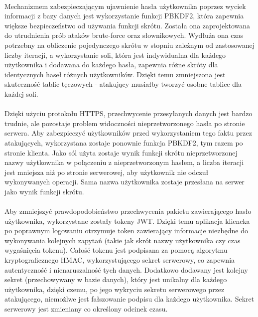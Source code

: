 \documentclass{article}
\begin{document}
    \paragraph{}Mechanizmem zabezpieczającym ujawnienie hasła użytkownika poprzez wyciek informacji z bazy danych jest wykorzystanie funkcji  PBKDF2, która zapewnia większe bezpieczeństwo od używania funkcji skrótu. Została ona zaprojektowana do utrudnienia prób ataków brute-force oraz słownikowych. Wydłuża ona czas potrzebny na obliczenie pojedynczego skrótu w stopniu zależnym od zastosowanej liczby iteracji, a wykorzystanie soli, która jest indywidualna dla każdego użytkownika i dodawana do każdego hasła, zapewnia różne skróty dla identycznych haseł różnych użytkowników. Dzięki temu zmniejszona jest skuteczność tablic tęczowych - atakujący musiałby tworzyć osobne tablice dla każdej soli.

    \paragraph{}Dzięki użyciu protokołu HTTPS, przechwycenie przesyłanych danych jest bardzo trudnie, ale pozostaje problem widoczności nieprzetworzonego hasła po stronie serwera. Aby zabezpieczyć użytkowników przed wykorzystaniem tego faktu przez atakujących, wykorzystana zostaje ponownie funkcja PBKDF2, tym razem po stronie klienta. Jako sól użyta zostaje wynik funkcji skrótu nieprzetworzonej nazwy użytkownika w połączeniu z nieprzetworzonym hasłem, a liczba iteracji jest mniejsza niż po stronie serwerowej, aby użytkownik nie odczuł wykonywanych operacji. Sama nazwa użytkownika zostaje przesłana na serwer jako wynik funkcji skrótu.

    \paragraph{}Aby zmniejszyć prawdopodobieństwo przechwycenia pakietu zawierającego hasło użytkownika, wykorzystane zostały tokeny JWT. Dzięki temu aplikacja kliencka po poprawnym logowaniu otrzymuje token zawierający informacje niezbędne do wykonywania kolejnych zapytań (takie jak skrót nazwy użytkownika czy czas wygaśnięcia tokenu). Całość tokenu jest podpisana za pomocą algorytmu kryptograficznego HMAC, wykorzystującego sekret serwerowy, co zapewnia autentyczność i nienaruszalność tych danych. Dodatkowo dodawany jest kolejny sekret (przechowywany w bazie danych), który jest unikalny dla każdego użytkownika, dzięki czemu, po jego wykryciu sekretu serwerowego przez atakującego, niemożlwe jest fałszowanie podpisu dla każdego użytkownika. Sekret serwerowy jest zmieniany co określony odcinek czasu.
\end{document}
